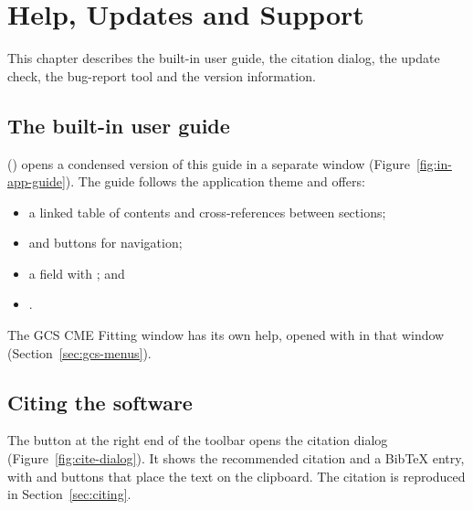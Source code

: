 \chapter{Help, Updates and Support}
\label{ch:help}

This chapter describes the built-in user guide, the citation dialog, the update check, the
bug-report tool and the version information.

\section{The built-in user guide}
\label{sec:in-app-guide}

 () opens a condensed version of this guide in a separate
window (Figure~\ref{fig:in-app-guide}). The guide follows the application theme and offers:
\begin{itemize}
  \item a linked table of contents and cross-references between sections;
  \item {} and  buttons for navigation;
  \item a  field with ; and
  \item {}.
\end{itemize}
The GCS CME Fitting window has its own help, opened with  in that window
(Section~\ref{sec:gcs-menus}).


\section{Citing the software}
\label{sec:cite-dialog}

The  button at the right end of the toolbar opens the citation
dialog (Figure~\ref{fig:cite-dialog}). It shows the recommended citation and a BibTeX
entry, with  and  buttons that place the text on the
clipboard. The citation is reproduced in Section~\ref{sec:citing}.

